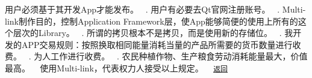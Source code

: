 
\begin{DoxyEnumerate}
\item 用户必须基于其开发\+App才能发布。 ~. 用户有必要去\+Qt官网注册账号。 ~. Multi-\/link制作目的，控制\+Application Framework层，使\+App能够简便的使用上所有的这个层次的\+Library。 ~. 所谓的拷贝根本不是拷贝，而是使用新的存储位。 ~. 我开发的\+A\+P\+P交易规则：按照换取相同能量消耗当量的产品所需要的货币数量进行收费。 ~. 为人工作进行收费。 ~. 农民种植作物、生产粮食劳动消耗能量最大，价值最高。 ~\newline
 使用\+Multi-\/link，代表权力人接受以上规定。 ~\newline
 \href{.}{\tt 返回} 
\end{DoxyEnumerate}